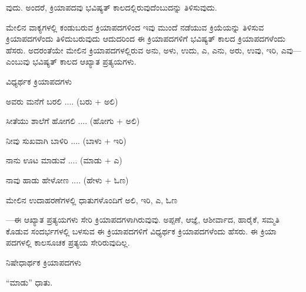 \indent ವುದು. ಅಂದರೆ, ಕ್ರಿಯಾಪದವು ಭವಿಷ್ಯತ್‌ ಕಾಲದಲ್ಲಿರುವುದೆಂಬುದನ್ನು ತಿಳಿಸುವುದು.\par

\indent ಮೇಲಿನ ವಾಕ್ಯಗಳಲ್ಲಿ ಕಂಡುಬರುವ ಕ್ರಿಯಾಪದಗಳಿಂದ ಇವು ಮುಂದೆ ನಡೆಯುವ ಕ್ರಿಯೆಯನ್ನು ತಿಳಿಸುವ ಕ್ರಿಯಾಪದಗಳೆಂದು ತಿಳಿದುಬರುವುದು ಆದುದರಿಂದ ಈ ಕ್ರಿಯಾಪದಗಳಿಗೆ ಭವಿಷ್ಯತ್‌ ಕಾಲದ ಕ್ರಿಯಾಪದಗಳೆಂದು ಹೆಸರು. ಅದರಂತೆಯೇ ಮೇಲಿನ ಕ್ರಿಯಾಪದಗಳಲ್ಲಿರುವ ಅನು, ಅಳು, ಉದು, ಎ, ಎನು, ಅರು, ಉವು, ಇರಿ, ಎವು—ಎಂಬುವು ಭವಿಷ್ಯತ್‌ ಕಾಲದ ಆಖ್ಯಾತ ಪ್ರತ್ಯಯಗಳು.\par

\vspace{2.5pt plus 3pt minus 0.5pt}\noindent\hspace*{1.2em}\hspace{0.55em}ವಿಧ್ಯರ್ಥಕ ಕ್ರಿಯಾಪದಗಳು\par

\vspace{3pt plus 2pt}\noindent\hspace*{1.2em}\par\vspace{1pt}

\indent ಅವರು ಮನೆಗೆ ಬರಲಿ .... (ಬರು + ಅಲಿ)\par

\indent ಸೀತೆಯು ಶಾಲೆಗೆ ಹೋಗಲಿ .... (ಹೋಗು + ಅಲಿ)\par

\indent ನೀವು ಸುಖವಾಗಿ ಬಾಳಿರಿ .... (ಬಾಳು + ಇರಿ)\par

\indent ನಾನು ಊಟ ಮಾಡುವೆ .... (ಮಾಡು + ಎ)\par

\indent ನಾವು ಹಾಡು ಹೇಳೋಣ .... (ಹೇಳು + ಓಣ)\par

\indent ಮೇಲಿನ ಉದಾಹರಣೆಗಳಲ್ಲಿ ಧಾತುಗಳೊಂದಿಗೆ ಅಲಿ, ಇರಿ, ಎ, ಓಣ\par

\indent —ಈ ಆಖ್ಯಾತ ಪ್ರತ್ಯಯಗಳು ಸೇರಿ ಕ್ರಿಯಾಪದಗಳಾಗಿರುವುವು. ಅಪ್ಪಣೆ, ಆಜ್ಞೆ, ಆಶೀರ್ವಾದ, ಹಾರೈಕೆ, ಸಮ್ಮತಿ ಕೊಡುವ ಸಂದರ್ಭಗಳಲ್ಲಿ ಬಳಸುವ ಈ ಕ್ರಿಯಾಪದಗಳಿಗೆ ವಿಧ್ಯರ್ಥಕ ಕ್ರಿಯಾಪದಗಳೆಂದು ಹೆಸರು. ಈ ಕ್ರಿಯಾ ಪದಗಳಲ್ಲಿ ಕಾಲಸೂಚಕ ಪ್ರತ್ಯಯ ಸೇರಿರುವುದಿಲ್ಲ.\par

\vspace{2.5pt plus 3pt minus 0.5pt}\noindent\hspace*{1.2em}\hspace{0.55em}ನಿಷೇಧಾರ್ಥಕ ಕ್ರಿಯಾಪದಗಳು\par

\noindent\hspace*{1.2em}\hspace{0.6em}“ಮಾಡು” ಧಾತು.\par

